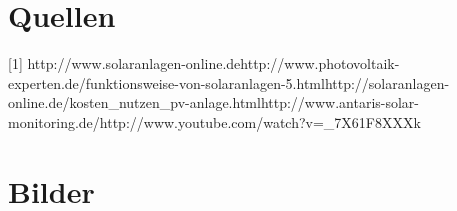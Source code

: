 \documentclass[12pt,titlepage]{article}
\begin{document}
\section{Quellen}

  [1] http://www.solaranlagen-online.de\newline
  [2] http://www.photovoltaik-experten.de/funktionsweise-von-solaranlagen-5.html\newline
  [3] http://solaranlagen-online.de/kosten\_nutzen\_pv-anlage.html\newline
  [4] http://www.antaris-solar-monitoring.de/\newline
  [5] http://www.youtube.com/watch?v=\_7X61F8XXXk

\newpage
\section{Bilder}
\end{document}
